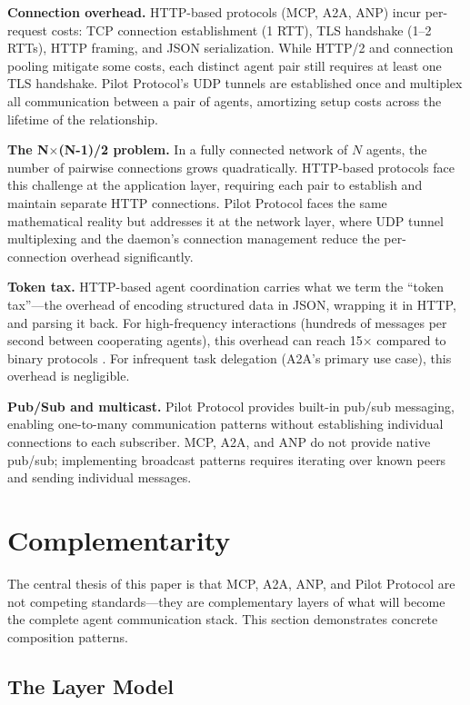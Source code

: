 \documentclass[11pt,a4paper]{article}
\begin{document}
\textbf{Connection overhead.} HTTP-based protocols (MCP, A2A, ANP) incur per-request costs: TCP connection establishment (1 RTT), TLS handshake (1--2 RTTs), HTTP framing, and JSON serialization. While HTTP/2 and connection pooling mitigate some costs, each distinct agent pair still requires at least one TLS handshake. Pilot Protocol's UDP tunnels are established once and multiplex all communication between a pair of agents, amortizing setup costs across the lifetime of the relationship.

\textbf{The N$\times$(N-1)/2 problem.} In a fully connected network of $N$ agents, the number of pairwise connections grows quadratically. HTTP-based protocols face this challenge at the application layer, requiring each pair to establish and maintain separate HTTP connections. Pilot Protocol faces the same mathematical reality but addresses it at the network layer, where UDP tunnel multiplexing and the daemon's connection management reduce the per-connection overhead significantly.

\textbf{Token tax.} HTTP-based agent coordination carries what we term the ``token tax''---the overhead of encoding structured data in JSON, wrapping it in HTTP, and parsing it back. For high-frequency interactions (hundreds of messages per second between cooperating agents), this overhead can reach 15$\times$ compared to binary protocols \cite{pilot-whitepaper}. For infrequent task delegation (A2A's primary use case), this overhead is negligible.

\textbf{Pub/Sub and multicast.} Pilot Protocol provides built-in pub/sub messaging, enabling one-to-many communication patterns without establishing individual connections to each subscriber. MCP, A2A, and ANP do not provide native pub/sub; implementing broadcast patterns requires iterating over known peers and sending individual messages.

\section{Complementarity}

The central thesis of this paper is that MCP, A2A, ANP, and Pilot Protocol are not competing standards---they are complementary layers of what will become the complete agent communication stack. This section demonstrates concrete composition patterns.

\subsection{The Layer Model}
\end{document}
